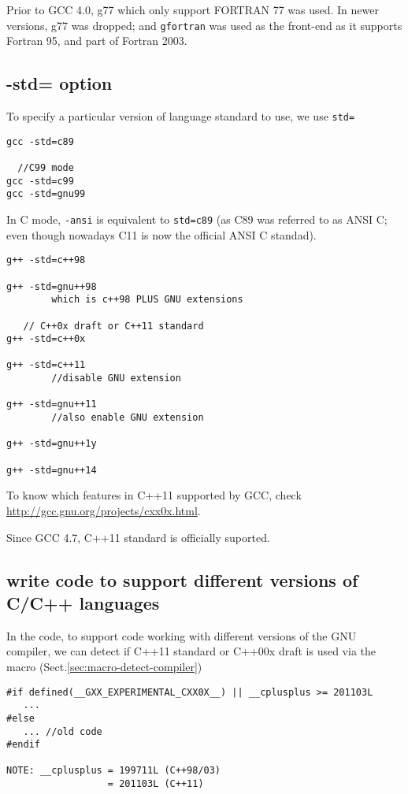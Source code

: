Prior to GCC 4.0, g77 which only support FORTRAN 77 was used. In newer versions,
g77 was dropped; and \verb!gfortran! was used as the front-end as it supports
Fortran 95, and part of Fortran 2003.

\subsection{-std= option}
\label{sec:-std-option-GNU}


To specify a particular version of language standard to use, we use \verb!std=!
\begin{verbatim}
gcc -std=c89 

  //C99 mode
gcc -std=c99 
gcc -std=gnu99 

\end{verbatim}
In C mode, \verb!-ansi! is equivalent to \verb!std=c89! (as C89 was referred to
as ANSI C; even though nowadays C11 is now the official ANSI C standad).

\begin{verbatim}
g++ -std=c++98

g++ -std=gnu++98
		which is c++98 PLUS GNU extensions

   // C++0x draft or C++11 standard
g++ -std=c++0x

g++ -std=c++11
		//disable GNU extension

g++ -std=gnu++11
		//also enable GNU extension

g++ -std=gnu++1y

g++ -std=gnu++14
\end{verbatim}

To know which features in C++11 supported by GCC, check
\url{http://gcc.gnu.org/projects/cxx0x.html}. 


Since GCC 4.7, C++11 standard is officially suported. 

\subsection{write code to support different versions of C/C++ languages}

In the code, to support code working with different versions of the GNU
compiler, we can  detect if C++11 standard or C++00x draft is used via 
the macro (Sect.\ref{sec:macro-detect-compiler})
\begin{verbatim}
#if defined(__GXX_EXPERIMENTAL_CXX0X__) || __cplusplus >= 201103L
   ...
#else
   ... //old code
#endif      

NOTE: __cplusplus = 199711L (C++98/03)
                  = 201103L (C++11)
\end{verbatim}

